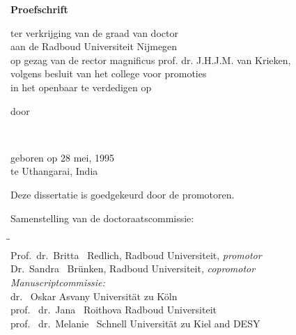 \begin{titlepage}
\begin{center}
        {\Large\titlefont\bfseries Proefschrift}

        \bigskip
        \bigskip

        ter verkrijging van de graad van doctor\\
        aan de Radboud Universiteit Nijmegen\\
        op gezag van de rector magnificus prof. dr. J.H.J.M. van Krieken,\\
        volgens besluit van het college voor promoties\\
        in het openbaar te verdedigen op\\

        \bigskip
        \bigskip

        door
        \bigskip
        \bigskip

        \makeatletter
        {\Large\titlefont\bfseries\@firstnames\ \MakeUppercase{\titleshape\@lastname}}
        \makeatother

        \bigskip
        \bigskip

        geboren op 28 mei, 1995\\
        te Uthangarai, India\\

        \vspace*{2\bigskipamount}

    \end{center}
    \clearpage
    \thispagestyle{empty}

    \noindent Deze dissertatie is goedgekeurd door de promotoren.

    \bigskip
    \noindent Samenstelling van de doctoraatscommissie:

    
    \begin{tabbing}
        \hspace{\tabcolsep}\=\hspace{0.33\textwidth}\=\hspace{0.66\textwidth}                   \\[-3\medskipamount]
        \> Prof.\ dr.\ Britta \ Redlich,    \> Radboud Universiteit, \textit{promotor}      \\
        \> Dr.\ Sandra \ Br\"{u}nken,        \> Radboud Universiteit, \textit{copromotor}    \\[\medskipamount]
        \>\textit{Manuscriptcommissie:}  \\[\smallskipamount]
        \> dr. \ Oskar Asvany            \> Universit\"{a}t zu K\"{o}ln \\
        \> prof. \ dr.\ Jana \ Roithova            \> Radboud Universiteit \\
        \> prof. \ dr.\ Melanie \ Schnell   \> Universit\"{a}t zu Kiel and DESY \\[\medskipamount]
    \end{tabbing}
\end{titlepage}


